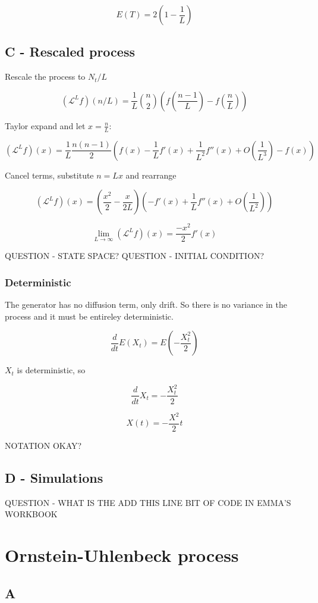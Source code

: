 \documentclass{article}
\begin{document}
$$E(T) = 2(1 - \frac{1}{L})$$


\subsection{C - Rescaled process}

Rescale the process to $N_t/L$

$$(\mathcal{L}^Lf)(n/L) = \frac{1}{L} {n\choose2} (f(\frac{n-1}{L}) - f(\frac{n}{L}))$$

Taylor expand and let $x=\frac{n}{L}$:

$$(\mathcal{L}^Lf)(x) = \frac{1}{L}\frac{n(n-1)}{2} (f(x) - \frac{1}{L}f'(x) + \frac{1}{L^2}f''(x) + O(\frac{1}{L^3}) - f(x))$$

Cancel terms, substitute $n=Lx$ and rearrange

$$(\mathcal{L}^Lf)(x) = (\frac{x^2}{2} - \frac{x}{2L})(- f'(x) + \frac{1}{L}f''(x) + O(\frac{1}{L^2}))$$

$$\lim_{L \to \infty} (\mathcal{L}^Lf)(x) = \frac{-x^2}{2}f'(x)$$



QUESTION - STATE SPACE?
QUESTION - INITIAL CONDITION?


\subsubsection{Deterministic}

The generator has no diffusion term, only drift. So there is no variance in the process and it must be entireley deterministic. 

$$\frac{d}{dt}E(X_t) = E(-\frac{X_t^2}{2})$$

$X_t$ is deterministic, so

$$\frac{d}{dt}X_t = -\frac{X_t^2}{2}$$

$$X(t) = -\frac{X^2}{2}t$$


NOTATION OKAY?


\subsection{D - Simulations}

QUESTION - WHAT IS THE ADD THIS LINE BIT OF CODE IN EMMA'S WORKBOOK

\section{Ornstein-Uhlenbeck process}

\subsection{A}
\end{document}
